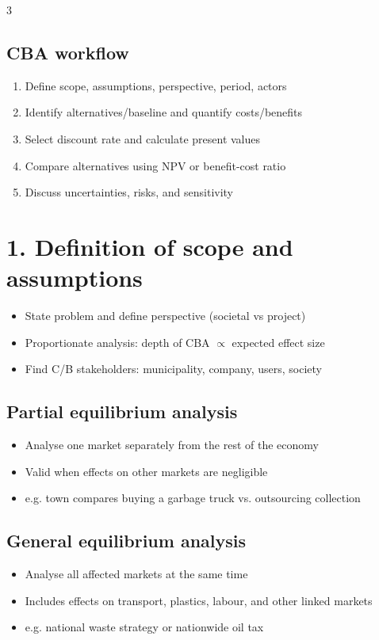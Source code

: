 \documentclass[9pt, landscape, a4paper]{article}
\begin{document}
\begin{multicols*}{3}
\subsection{CBA workflow}
\begin{enumerate}[label=\arabic*.]
  \item Define scope, assumptions, perspective, period, actors
  \item Identify alternatives/baseline and quantify costs/benefits
  \item Select discount rate and calculate present values
  \item Compare alternatives using NPV or benefit-cost ratio
  \item Discuss uncertainties, risks, and sensitivity
\end{enumerate}

\section{1. Definition of scope and assumptions}
\begin{itemize}
  \item State problem and define perspective (societal vs project)
  \item Proportionate analysis: depth of CBA $\propto$ expected effect size
  \item Find C/B stakeholders: municipality, company, users, society
\end{itemize}

\subsection{Partial equilibrium analysis}
\begin{itemize}
  \item Analyse one market separately from the rest of the economy
  \item Valid when effects on other markets are negligible
  \item e.g. town compares buying a garbage truck vs. outsourcing collection
\end{itemize}

\subsection{General equilibrium analysis}
\begin{itemize}
  \item Analyse all affected markets at the same time
  \item Includes effects on transport, plastics, labour, and other linked markets
  \item e.g. national waste strategy or nationwide oil tax
\end{itemize}


\end{multicols*}
\end{document}
